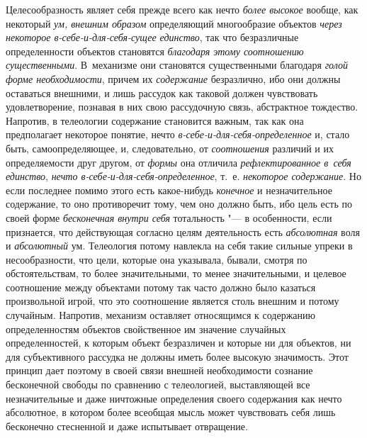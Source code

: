 Целесообразность являет себя прежде всего как нечто
{\em более высокое}
вообще, как некоторый
{\em ум, внешним образом}
определяющий многообразие объектов
{\em через некоторое
в-себе-и-для-себя-сущее единство}, так что безразличные
определенности объектов становятся
{\em благодаря этому соотношению
существенными}. В~механизме они становятся существенными
благодаря {\em голой форме
необходимости}, причем их
{\em содержание}
безразлично, ибо они должны оставаться внешними, и лишь
рассудок как таковой должен чувствовать удовлетворение, познавая в них свою
рассудочную связь, абстрактное тождество. Напротив, в телеологии содержание
становится важным, так как она предполагает некоторое понятие, нечто
{\em в-себе-и-для-себя-определенное}
и, стало быть, самоопределяющее, и, следовательно, от
{\em соотношения}
различий и их определяемости друг другом, от
{\em формы} она отличила
{\em рефлектированное в~себя единство},
{\em нечто
в-себе-и-для-себя-определенное}, т.~е.
{\em некоторое содержание}.
Но если последнее помимо этого есть какое-нибудь
{\em конечное} и
незначительное содержание, то оно противоречит тому, чем оно должно быть,
ибо цель есть по своей форме
{\em бесконечная внутри себя}
тотальность "--- в особенности, если признается,
что действующая согласно целям деятельность есть
{\em абсолютная} воля и
{\em абсолютный} ум.
Телеология потому навлекла на себя такие сильные упреки в несообразности,
что цели, которые она указывала, бывали, смотря по обстоятельствам, то
более значительными, то менее значительными, и целевое соотношение между
объектами потому так часто должно было казаться произвольной игрой, что это
соотношение является столь внешним и потому случайным. Напротив, механизм
оставляет относящимся к содержанию определенностям объектов свойственное им
значение случайных определенностей, к которым объект безразличен и которые
ни для объектов, ни для субъективного рассудка не должны
иметь более высокую значимость. Этот принцип дает поэтому в своей связи
внешней необходимости сознание бесконечной свободы по сравнению с
телеологией, выставляющей все незначительные и даже ничтожные определения
своего содержания как нечто абсолютное, в котором более всеобщая мысль
может чувствовать себя лишь бесконечно стесненной и даже испытывает
отвращение.

